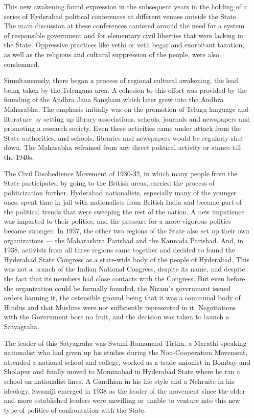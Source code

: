This new awakening found expression in the subsequent years in the holding of a series of Hyderabad political conferences at different venues outside the State. The main discussion at these conferences cantered around the need for a system of responsible government and for elementary civil liberties that were lacking in the State. Oppressive practices like vethi or veth begar and exorbitant taxation, as well as the religious and cultural suppression of the people, were also condemned. 

Simultaneously, there began a process of regional cultural awakening, the lead being taken by the Telengana area. A cohesion to this effort was provided by the founding of the Andhra Jana Sangham which later grew into the Andhra Mahasabha. The emphasis initially was on the promotion of Telugu language and literature by setting up library associations, schools, journals and newspapers and promoting a research society. Even these activities came under attack from the State authorities, and schools, libraries and newspapers would be regularly shut down. The Mahasabha refrained from any direct political activity or stance till the 1940s. 

The Civil Disobedience Movement of 1930-32, in which many people from the State participated by going to the British areas, carried the process of politicization further. Hyderabad nationalists, especially many of the younger ones, spent time in jail with nationalists from British India and became part of the political trends that were sweeping the rest of the nation. A new impatience was imparted to their politics, and the pressure for a more vigorous politics became stronger. In 1937, the other two regions of the State also set up their own organizations — the Maharashtra Parishad and the Kannada Parishad. And, in 1938, activists from all three regions came together and decided to found the Hyderabad State Congress as a state-wide body of the people of Hyderabad. This was not a branch of the Indian National Congress, despite its name, and despite the fact that its members had close contacts with the Congress. But even before the organization could be formally founded, the Nizam’s government issued orders banning it, the ostensible ground being that it was a communal body of Hindus and that Muslims were not sufficiently represented in it. Negotiations with the Government bore no fruit, and the decision was taken to launch a Satyagraha. 

The leader of this Satyagraha was Swami Ramanand Tirtha, a Marathi-speaking nationalist who had given up his studies during the Non-Cooperation Movement, attended a national school and college, worked as a trade unionist in Bombay and Sholapur and finally moved to Mominabad in Hyderabad State where he ran a school on nationalist lines. A Gandhian in his life­ style and a Nehruite in his ideology, Swamiji emerged in 1938 as the leader of the movement since the older and more established leaders were unwilling or unable to venture into this new type of politics of confrontation with the State. 

